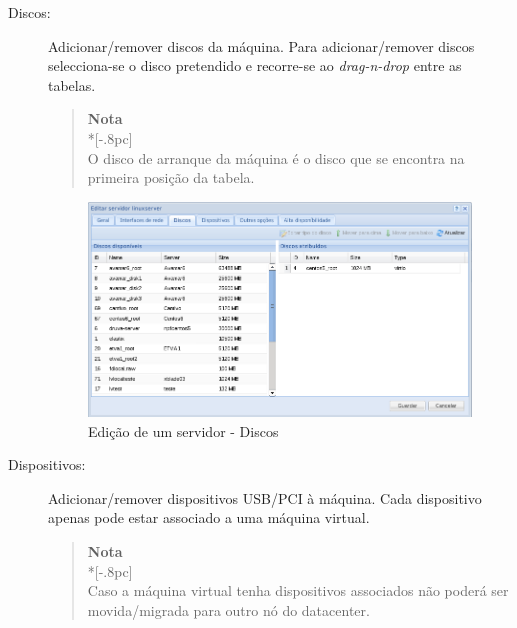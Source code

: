 \begin{description}
	\item[Discos:] Adicionar/remover discos da máquina. Para adicionar/remover discos selecciona-se o disco pretendido e recorre-se ao \emph{drag-n-drop} entre as tabelas.
                    
                \begin{quote}
                    {\large \bf Nota} \\*[-.8pc]
                    \underline{\hspace{6in}} \\
                    O disco de arranque da máquina é o disco que se encontra na primeira posição da tabela.
                \end{quote}
                    
		\begin{figure}[H]
        		\begin{center}
		        \includegraphics[scale=0.5]{screenshots/server_edit_disks.png}
        		\caption{Edição de um servidor - Discos}
		        \label{fig:server_edit_disks}
	        	\end{center}
		\end{figure}
    \item[Dispositivos:] Adicionar/remover dispositivos USB/PCI à máquina. Cada dispositivo apenas pode estar associado a uma máquina virtual. 

                \begin{quote}
                    {\large \bf Nota} \\*[-.8pc]
                    \underline{\hspace{6in}} \\
                    Caso a máquina virtual tenha dispositivos associados não poderá ser movida/migrada para outro nó do datacenter.
                \end{quote}
    

\end{description}
